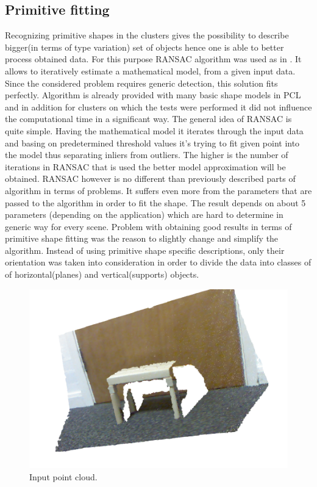 \documentclass[12pt,oneside]{amsart}
\begin{document}
\subsection{Primitive fitting}
Recognizing primitive shapes in the clusters gives the possibility to describe bigger(in terms of type variation) set of objects hence one is able to better process obtained data. For this purpose RANSAC algorithm was used as in \cite{pap1}. It allows to iteratively estimate a mathematical model, from a given input data. Since the considered problem requires generic detection, this solution fits perfectly. Algorithm is already provided with many basic shape models in PCL and in addition for clusters on which the tests were performed it did not influence the computational time in a significant way.
\newline
\indent The general idea of RANSAC is quite simple. Having the mathematical model it iterates through the input data and basing on predetermined threshold values it's trying to fit given point into the model thus separating inliers from outliers. The higher is the number of iterations in RANSAC that is used the better model approximation will be obtained.
\newline
\indent RANSAC however is no different than previously described parts of algorithm in terms of problems. It suffers even more from the parameters that are passed to the algorithm in order to fit the shape. The result depends on about 5 parameters (depending on the application) which are hard to determine in generic way for every scene. Problem with obtaining good results in terms of primitive shape fitting was the reason to slightly change and simplify the algorithm. Instead of using primitive shape specific descriptions, only their orientation was taken into consideration in order to divide the data into classes of of horizontal(planes) and vertical(supports) objects.  
\begin{figure}
  \begin{center}
    \includegraphics[scale=0.5]{images/rgbTable}
    \caption{Input point cloud.}
    \label{fig:rgbTable}
  \end{center}
\end{figure}
\end{document}
